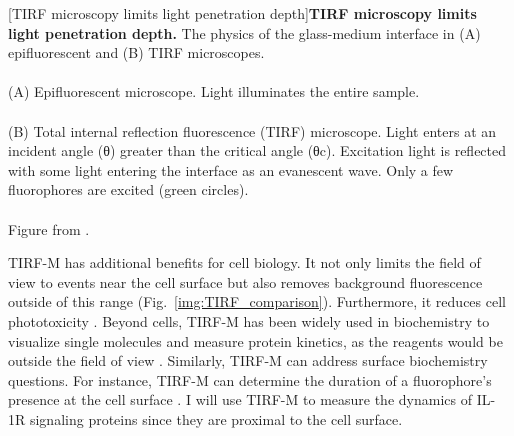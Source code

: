 \begin{centering}
\captionsetup{parbox=none}
[TIRF microscopy limits light penetration depth]{\textbf{TIRF microscopy limits light penetration depth.} The physics of the glass-medium interface in (A) epifluorescent and (B) TIRF microscopes.
\\
\\
(A) Epifluorescent microscope. Light illuminates the entire sample.
\\
\\
(B) Total internal reflection fluorescence (TIRF) microscope. Light enters at an incident angle (θ) greater than the critical angle (θc). Excitation light is reflected with some light entering the interface as an evanescent wave. Only a few fluorophores are excited (green circles).
\\
\\
Figure from \autocite{Mattheyses_2010}.}
\label{img:TIRF}
\end{centering}
 
TIRF-M has additional benefits for cell biology. It not only limits the field of view to events near the cell surface but also removes background fluorescence outside of this range (Fig.~\ref{img:TIRF_comparison}). Furthermore, it reduces cell phototoxicity \autocite{Fish_2022}. Beyond cells, TIRF-M has been widely used in biochemistry to visualize single molecules and measure protein kinetics, as the reagents would be outside the field of view \autocite{Axelrod_2001}\autocite{Boehm_2016}. Similarly, TIRF-M can address surface biochemistry questions. For instance, TIRF-M can determine the duration of a fluorophore's presence at the cell surface \autocite{Leake_2006}\autocite{Boehm_2016}. I will use TIRF-M to measure the dynamics of IL-1R signaling proteins since they are proximal to the cell surface.
 
